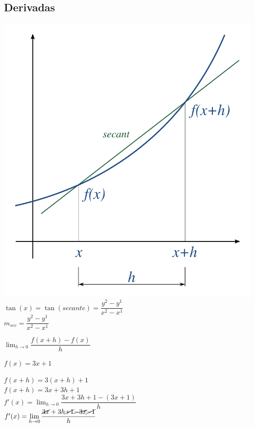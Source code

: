 \documentclass[stu, 12pt, letterpaper, donotrepeattitle, floatsintext, natbib]{apa7}
\begin{document}
    \subsection{Derivadas}\label{subsec:derivadas}
    \begin{paracol}{2}
        \includegraphics[scale=0.2]{derivative}
        \switchcolumn
        $\tan(x) = \tan({secante}) = \dfrac{y^2-y^1}{x^2-x^1}$\\[0.5cm]
        $m_{sec} = \dfrac{y^2-y^1}{x^2-x^1}$
    \end{paracol}

    $\displaystyle\lim_{h \to 0} \dfrac{f(x+h)-f(x)}{h} $\\[0.5cm]
    \begin{center}
        $f(x)=3x+1$\\[0.5cm]
    \end{center}
    \begin{paracol}{2}
        $f(x+h)=3(x+h)+1$\\[0.5cm]
        $f(x+h)=3x+3h+1$\\[0.5cm]
        \switchcolumn
        $f'(x)=\displaystyle\lim_{h\to0} \dfrac{3x+3h+1-(3x+1)}{h}$\\[0.5cm]
        $f'(x)=\displaystyle\lim_{h\to0} \dfrac{\cancel{3x}+3h\cancel{+1}\cancel{-3x}\cancel{-1}}{h}$\\[0.5cm]
    \end{paracol}

    \renewcommand\refname{\large\textbf{Referencias}}
%    
    
\end{document}
